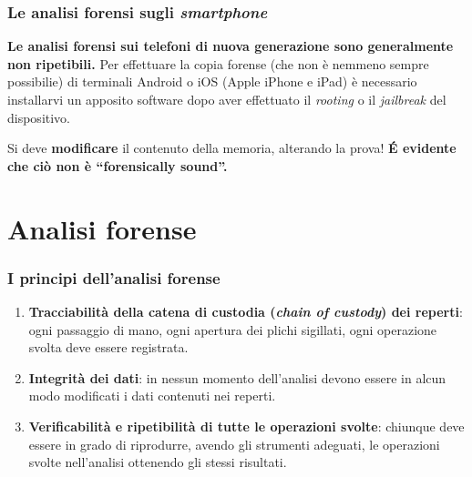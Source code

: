 \documentclass[11pt]{beamer}
\begin{document}
	\begin{frame}
		\frametitle{Le analisi forensi sugli \textit{smartphone}}
		\centering 
		
		\textbf{Le analisi forensi sui telefoni di nuova generazione sono generalmente non ripetibili.} 
		\vfill
		\justifying
		Per effettuare la copia forense (che non è nemmeno sempre possibilie) di terminali Android o iOS (Apple iPhone e iPad) è necessario installarvi un apposito software dopo aver effettuato il \textit{rooting} o il \textit{jailbreak} del dispositivo. 
		\vfill

		Si deve \textbf{modificare} il contenuto della memoria, alterando la prova! 
		\vfill
		\centering
		\textbf{\'{E} evidente che ciò non è ``forensically sound''.}
	\end{frame}		
	
	\section{Analisi forense}
	
	\begin{frame}
		\frametitle{I principi dell'analisi forense}
		\begin{enumerate}
			\item \textbf{Tracciabilità della catena di custodia (\textit{chain of custody}) dei reperti}: ogni passaggio di mano, ogni apertura dei plichi sigillati, ogni operazione svolta deve essere registrata.
			\item \textbf{Integrità dei dati}: in nessun momento dell'analisi devono essere in alcun modo modificati i dati contenuti nei reperti.
			\item \textbf{Verificabilità e ripetibilità di tutte le operazioni svolte}: chiunque deve essere in grado di riprodurre, avendo gli strumenti adeguati, le operazioni svolte nell'analisi ottenendo gli stessi risultati.
		\end{enumerate}

	\end{frame}
	
\end{document}
